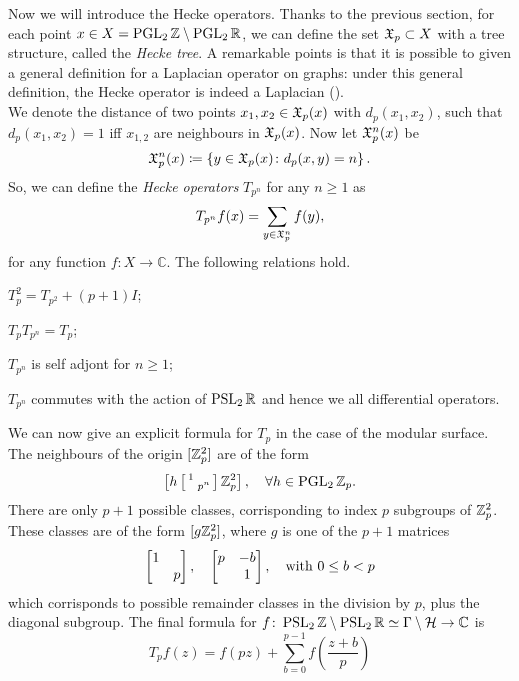 Now we will introduce the Hecke operators. Thanks to the previous section, for each point $x\in X=\operatorname{PGL}_{2}\mathbb{Z}\setminus\operatorname{PGL}_{2}\mathbb{R}$, we can define the set $\mathfrak{X}_{p}\subset X$ with a tree structure, called the \emph{Hecke tree}. A remarkable points is that it is possible to given a general definition for a Laplacian operator on graphs: under this general definition, the Hecke operator is indeed a Laplacian (\cite{EinTW:AQUE}).\\
We denote the distance of two points $x_{1},x_{2}\in\mathfrak{X}_{p}(x)$ with $d_{p}(x_{1},x_{2})$, such that $d_{p}(x_{1},x_{2})=1$ iff $x_{1,2}$ are neighbours in $\mathfrak{X}_{p}(x)$. Now let $\mathfrak{X}_{p}^{n}(x)$ be
\begin{equation}
\label{eq:Xp_decomp_cartan}
\mathfrak{X}_{p}^{n}(x)\coloneqq \left\{
y\in\mathfrak{X}_{p}(x)\colon d_{p}(x,y)=n
\right\}.
\end{equation}
So, we can define the \emph{Hecke operators} $T_{p^{n}}$ for any $n\geq1$ as 
\[
T_{p^{n}}f(x)=\sum_{y\in\mathfrak{X}_{p}^{n}}f(y),
\]
for any function $f\colon X\to\mathbb{C}$. The following relations hold.

\begin{nlem}
\label{lem:hecke_prop}
\begin{compactitem}
\item $T_{p}^{2}=T_{p^{2}}+(p+1) I$;
\item $T_{p}T_{p^{n}}=T_{p}$;
\item $T_{p^{n}}$ is self adjont for $n\geq1$;
\item $T_{p^{n}}$ commutes with the action of $\operatorname{PSL}_{2}\mathbb{R}$ and hence we all differential operators.
\end{compactitem}
\end{nlem}
We can now give an explicit formula for $T_{p}$ in the case of the modular surface. The neighbours of the origin $[\mathbb{Z}_{p}^{2}]$ are of the form
\[
\left[
h\left[\begin{smallmatrix} 1&\\&p^{n} \end{smallmatrix}\right]\mathbb{Z}_{p}^{2}
\right],\quad\forall h\in\operatorname{PGL}_{2}\mathbb{Z}_{p}.
\]
There are only $p+1$ possible classes, corrisponding to index $p$ subgroups of $\mathbb{Z}_{p}^{2}$. These classes are of the form $[g\mathbb{Z}_{p}^{2}]$, where $g$ is one of the $p+1$ matrices
\[
\begin{bmatrix} 1&\\&p \end{bmatrix},\quad\begin{bmatrix} p&-b\\&1 \end{bmatrix},\quad\text{with }0\leq b<p
\]
which corrisponds to possible remainder classes in the division by $p$, plus the diagonal subgroup. The final formula 
for $f\colon\operatorname{PSL}_{2}\mathbb{Z}\setminus\operatorname{PSL}_{2}\mathbb{R}\simeq\Gamma\setminus\mathcal{H}\to\mathbb{C}$ is 
\begin{equation}
\label{eq:hecke_operator}
T_{p}f(z)=f(pz)+\sum_{b=0}^{p-1}f\left(\frac{z+b}{p}\right)
\end{equation}


